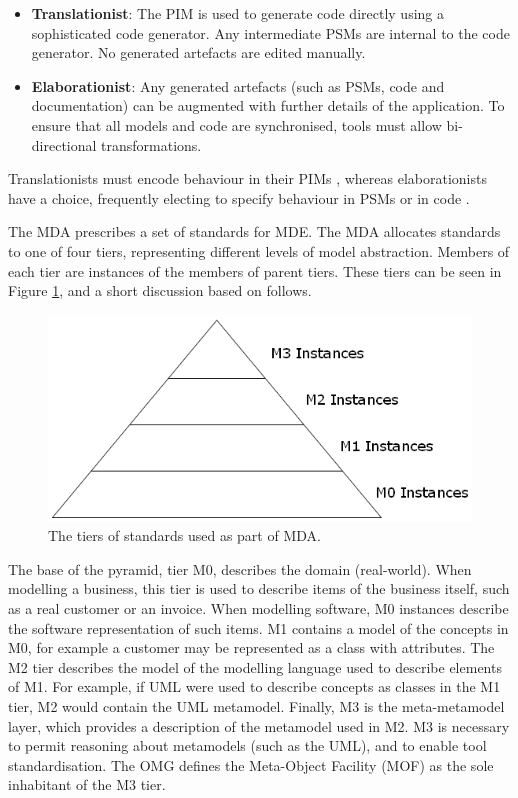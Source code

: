 \begin{itemize}
 \item \textbf{Translationist}: The PIM is used to generate code directly using a sophisticated code generator. Any intermediate PSMs are internal to the code generator. No generated artefacts are edited manually.
 \item \textbf{Elaborationist}: Any generated artefacts (such as PSMs, code and documentation) can be augmented with further details of the application. To ensure that all models and code are synchronised, tools must allow bi-directional transformations.
\end{itemize}

Translationists must encode behaviour in their PIMs \cite{mellor02executable}, whereas elaborationists have a choice, frequently electing to specify behaviour in PSMs or in code \cite{kleppe03mda}.

The MDA prescribes a set of standards for MDE. The MDA allocates standards to one of four tiers, representing different levels of model abstraction. Members of each tier are instances of the members of parent tiers. These tiers can be seen in Figure \ref{fig:mda-pyramid}, and a short discussion based on \cite[Section 8.2]{kleppe03mda} follows.

\begin{figure}[htbp]
  \begin{center}
    \leavevmode
    \includegraphics[scale=0.5]{2.Background/images/mda-pyramid.png}
  \end{center}
  \caption{The tiers of standards used as part of MDA.}
  \label{fig:mda-pyramid}
\end{figure}

The base of the pyramid, tier M0, describes the domain (real-world). When modelling a business, this tier is used to describe items of the business itself, such as a real customer or an invoice. When modelling software, M0 instances describe the software representation of such items. M1 contains a model of the concepts in M0, for example a customer may be represented as a class with attributes. The M2 tier describes the model of the modelling language used to describe elements of M1. For example, if UML \cite{uml212} were used to describe concepts as classes in the M1 tier, M2 would contain the UML metamodel. Finally, M3 is the meta-metamodel layer, which provides a description of the metamodel used in M2. M3 is necessary to permit reasoning about metamodels (such as the UML), and to enable tool standardisation. The OMG defines the Meta-Object Facility (MOF) \cite{mof} as the sole inhabitant of the M3 tier.



